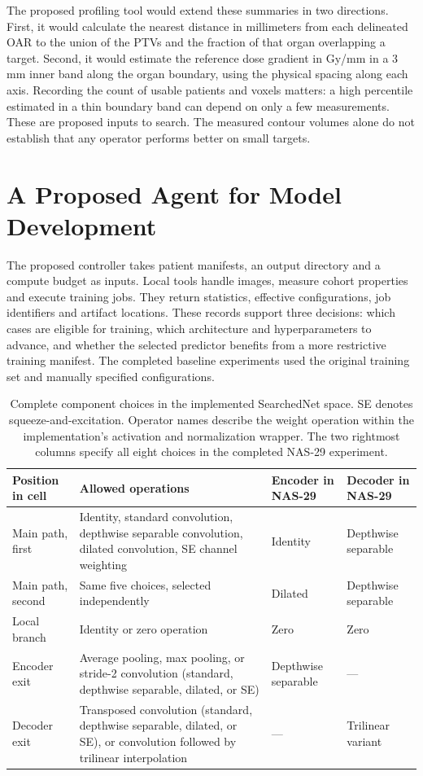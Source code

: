 \documentclass[letterpaper]{article}
\begin{document}
The proposed profiling tool would extend these summaries in two directions. First, it would calculate the nearest distance in millimeters from each delineated OAR to the union of the PTVs and the fraction of that organ overlapping a target. Second, it would estimate the reference dose gradient in Gy/mm in a 3 mm inner band along the organ boundary, using the physical spacing along each axis. Recording the count of usable patients and voxels matters: a high percentile estimated in a thin boundary band can depend on only a few measurements. These are proposed inputs to search. The measured contour volumes alone do not establish that any operator performs better on small targets.

\section{A Proposed Agent for Model Development}
The proposed controller takes patient manifests, an output directory and a compute budget as inputs. Local tools handle images, measure cohort properties and execute training jobs. They return statistics, effective configurations, job identifiers and artifact locations. These records support three decisions: which cases are eligible for training, which architecture and hyperparameters to advance, and whether the selected predictor benefits from a more restrictive training manifest. The completed baseline experiments used the original training set and manually specified configurations.

\begin{table}[t]
\centering
\begin{tabular}{lp{3.00in}ll}
\toprule
Position in cell & Allowed operations & Encoder in NAS-29 & Decoder in NAS-29\\
\midrule
Main path, first & Identity, standard convolution, depthwise separable convolution, dilated convolution, SE channel weighting & Identity & Depthwise separable\\
Main path, second & Same five choices, selected independently & Dilated & Depthwise separable\\
Local branch & Identity or zero operation & Zero & Zero\\
Encoder exit & Average pooling, max pooling, or stride-2 convolution (standard, depthwise separable, dilated, or SE) & Depthwise separable & ---\\
Decoder exit & Transposed convolution (standard, depthwise separable, dilated, or SE), or convolution followed by trilinear interpolation & --- & Trilinear variant\\
\bottomrule
\end{tabular}
\caption{Complete component choices in the implemented SearchedNet space. SE denotes squeeze-and-excitation. Operator names describe the weight operation within the implementation's activation and normalization wrapper. The two rightmost columns specify all eight choices in the completed NAS-29 experiment.}
\label{tab:ops}
\end{table}
\end{document}
